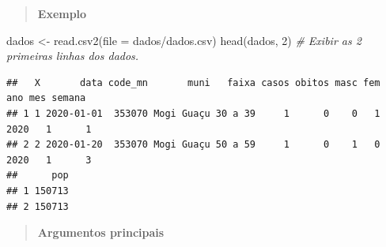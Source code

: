 \documentclass[
]{book}
\newenvironment{Shaded}{\begin{snugshade}}{\end{snugshade}}
\newcommand{\AttributeTok}[1]{\textcolor[rgb]{0.77,0.63,0.00}{#1}}
\newcommand{\CommentTok}[1]{\textcolor[rgb]{0.56,0.35,0.01}{\textit{#1}}}
\newcommand{\DecValTok}[1]{\textcolor[rgb]{0.00,0.00,0.81}{#1}}
\newcommand{\FunctionTok}[1]{\textcolor[rgb]{0.00,0.00,0.00}{#1}}
\newcommand{\NormalTok}[1]{#1}
\newcommand{\OtherTok}[1]{\textcolor[rgb]{0.56,0.35,0.01}{#1}}
\newcommand{\StringTok}[1]{\textcolor[rgb]{0.31,0.60,0.02}{#1}}
\theoremstyle{definition}
\theoremstyle{definition}
\theoremstyle{definition}
\theoremstyle{definition}
\theoremstyle{remark}
\begin{document}
\begin{quote}
\textbf{Exemplo}
\end{quote}

\begin{Shaded}
\begin{Highlighting}[]
\NormalTok{dados }\OtherTok{\textless{}{-}} \FunctionTok{read.csv2}\NormalTok{(}\AttributeTok{file =} \StringTok{\textquotesingle{}dados/dados.csv\textquotesingle{}}\NormalTok{)}
\FunctionTok{head}\NormalTok{(dados, }\DecValTok{2}\NormalTok{)          }\CommentTok{\# Exibir as 2 primeiras linhas dos dados.}
\end{Highlighting}
\end{Shaded}

\begin{verbatim}
##   X       data code_mn       muni   faixa casos obitos masc fem  ano mes semana
## 1 1 2020-01-01  353070 Mogi Guaçu 30 a 39     1      0    0   1 2020   1      1
## 2 2 2020-01-20  353070 Mogi Guaçu 50 a 59     1      0    1   0 2020   1      3
##      pop
## 1 150713
## 2 150713
\end{verbatim}

\begin{quote}
\textbf{Argumentos principais}
\end{quote}
\end{document}
